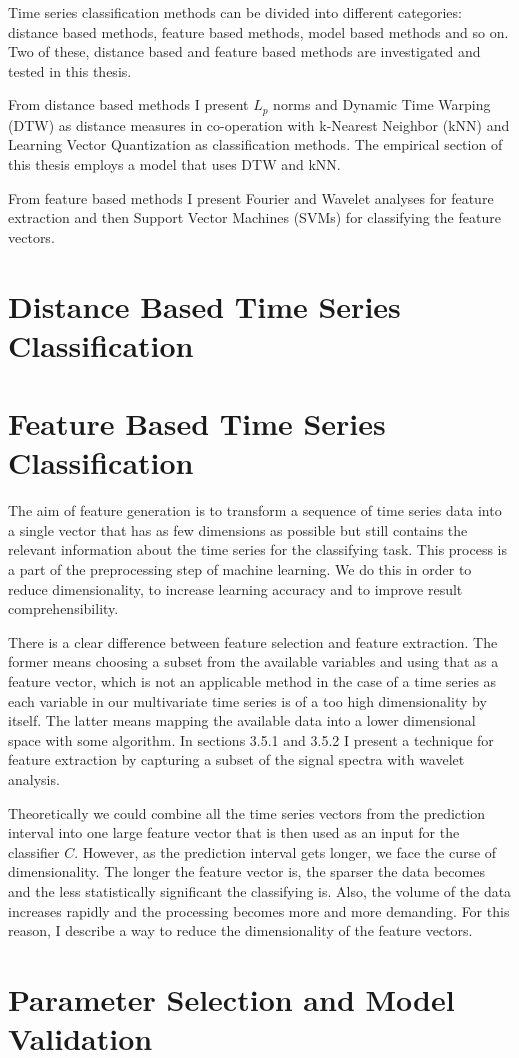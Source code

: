 Time series classification methods can be divided into different categories: distance based methods, feature based methods, model based methods and so on. Two of these, distance based and feature based methods are investigated and tested in this thesis. 

From distance based methods I present $L_p$ norms and Dynamic Time Warping (DTW) as distance measures in co-operation with k-Nearest Neighbor (kNN) and Learning Vector Quantization as classification methods. The empirical section of this thesis employs a model that uses DTW and kNN.

From feature based methods I present Fourier and Wavelet analyses for feature extraction and then Support Vector Machines (SVMs) for classifying the feature vectors.



\section{Distance Based Time Series Classification}


\section{Feature Based Time Series Classification}
The aim of feature generation is to transform a sequence of time series data into a single vector that has as few dimensions as possible but still contains the relevant information about the time series for the classifying task. This process is a part of the preprocessing step of machine learning. We do this in order to reduce dimensionality, to increase learning accuracy and to improve result comprehensibility. \cite{Yu03}

There is a clear difference between feature selection and feature extraction. The former means choosing a subset from the available variables and using that as a feature vector, which is not an applicable method in the case of a time series as each variable in our multivariate time series is of a too high dimensionality by itself. The latter means mapping the available data into a lower dimensional space with some algorithm. \cite{Yu03} In sections 3.5.1 and 3.5.2 I present a technique for feature extraction by capturing a subset of the signal spectra with wavelet analysis.

Theoretically we could combine all the time series vectors from the prediction interval into one large feature vector that is then used as an input for the classifier $C$. However, as the prediction interval gets longer, we face the curse of dimensionality. The longer the feature vector is, the sparser the data becomes and the less statistically significant the classifying is. Also, the volume of the data increases rapidly and the processing becomes more and more demanding. \cite{Pascual07} For this reason, I describe a way to reduce the dimensionality of the feature vectors.








\section{Parameter Selection and Model Validation}




